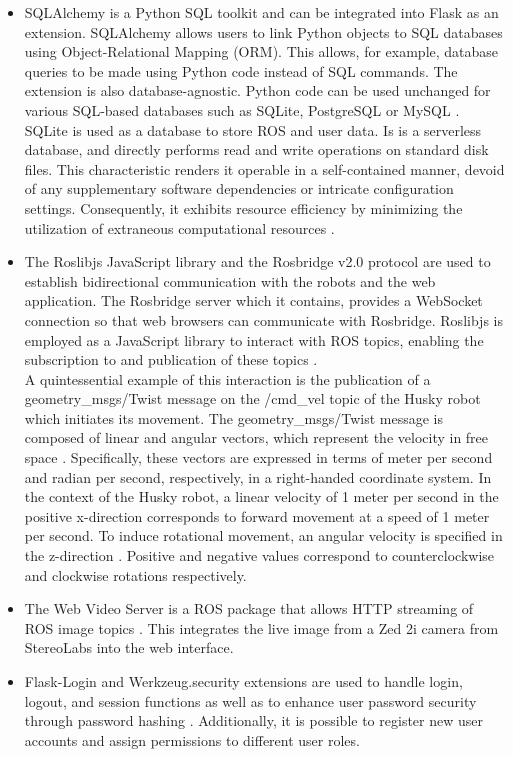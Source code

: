 \documentclass[conference]{IEEEtran}
\begin{document}
\begin{itemize}
\item SQLAlchemy is a Python SQL toolkit and can be integrated into Flask as an extension. SQLAlchemy allows users to link Python objects to SQL databases using Object-Relational Mapping (ORM). This allows, for example, database queries to be made using Python code instead of SQL commands. The extension is also database-agnostic. 
Python code can be used unchanged for various SQL-based databases such as SQLite, PostgreSQL or MySQL \cite{sqlalchemy}. 
SQLite is used as a database to store ROS and user data. Is is a serverless database, and directly performs read and write operations on standard disk files. This characteristic renders it operable in a self-contained manner, devoid of any supplementary software dependencies or intricate configuration settings. Consequently, it exhibits resource efficiency by minimizing the utilization of extraneous computational resources \cite{sqlite}.
\item The Roslibjs JavaScript library and the Rosbridge v2.0 protocol are used to establish bidirectional communication with the robots and the web application. The Rosbridge server which it contains, provides a WebSocket connection so that web browsers can communicate with Rosbridge.
Roslibjs is employed as a JavaScript library to interact with ROS topics, enabling the subscription to and publication of these topics \cite{rosbridgeOkState} \cite{rosbridgeSuite}.\\ A quintessential example of this interaction is the publication of a geometry\_msgs/Twist message on the /cmd\_vel topic of the Husky robot which initiates its movement.
The geometry\_msgs/Twist message is composed of linear and angular vectors, which represent the velocity in free space \cite{twistmsg}. Specifically, these vectors are expressed in terms of meter per second and radian per second, respectively, in a right-handed coordinate system.
In the context of the Husky robot, a linear velocity of 1 meter per second in the positive x-direction corresponds to forward movement at a speed of 1 meter per second. To induce rotational movement, an angular velocity is specified in the z-direction \cite{huskydriving}. Positive and negative values correspond to counterclockwise and clockwise rotations respectively.
\item The Web Video Server is a ROS package that allows HTTP streaming of ROS image topics \cite{webvideoserver}. This integrates the live image from a Zed 2i camera from StereoLabs \cite{zed} into the web interface.
\item Flask-Login and Werkzeug.security extensions are used to handle login, logout, and session functions as well as to enhance user password security through password hashing \cite{flasklogin} \cite{werkzeug}. Additionally, it is possible to register new user accounts and assign permissions to different user roles. 
\end{itemize}
\end{document}
